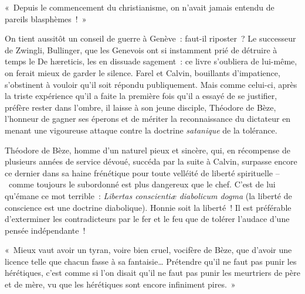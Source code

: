 \documentclass[french,twoside]{book} %
\newcommand{\astermono}{\medskip\centerline{\color{rubric}\large\selectfont{\syms ✻}}\medskip\par}%
\newcommand\foreign[1]{\emph{#1}}
\newenvironment{quoteblock}%
  {\begin{quoting}}
  {\end{quoting}}
\newenvironment{quotebar}{%
    \def\FrameCommand{{\color{rubric!10!}\vrule width 0.5em} \hspace{0.9em}}%
    \def\OuterFrameSep{2pt} %
    \MakeFramed {\advance\hsize-\width \FrameRestore}
  }%
  {%
    \endMakeFramed
  }
\renewenvironment{quoteblock}%
  {%
    \savenotes
    \setstretch{0.9}
    \normalfont
    \begin{quotebar}
  }
  {%
    \end{quotebar}
    \spewnotes
  }
\begin{document}
\begin{quoteblock}
\noindent « Depuis le commencement du christianisme, on n’avait jamais entendu de pareils blasphèmes ! »\end{quoteblock}

\noindent On tient aussitôt un conseil de guerre à Genève : faut-il riposter ? Le successeur de Zwingli, Bullinger, que les Genevois ont si instamment prié de détruire à temps le De hæreticis, les en dissuade sagement : ce livre s’oubliera de lui-même, on ferait mieux de garder le silence. Farel et Calvin, bouillants d’impatience, s’obstinent à vouloir qu’il soit répondu publiquement. Mais comme celui-ci, après la triste expérience qu’il a faite la première fois qu’il a essayé de se justifier, préfère rester dans l’ombre, il laisse à son jeune disciple, Théodore de Bèze, l’honneur de gagner ses éperons et de mériter la reconnaissance du dictateur en menant une vigoureuse attaque contre la doctrine \emph{satanique} de la tolérance.\par

\astermono

\noindent Théodore de Bèze, homme d’un naturel pieux et sincère, qui, en récompense de plusieurs années de service dévoué, succéda par la suite à Calvin, surpasse encore ce dernier dans sa haine frénétique pour toute velléité de liberté spirituelle – comme toujours le subordonné est plus dangereux que le chef. C’est de lui qu’émane ce mot terrible : \foreign{Libertas conscientiæ diabolicum dogma} (la liberté de conscience est une doctrine diabolique). Honnie soit la liberté ! Il est préférable d’exterminer les contradicteurs par le fer et le feu que de tolérer l’audace d’une pensée indépendante !\par

\begin{quoteblock}
\noindent « Mieux vaut avoir un tyran, voire bien cruel, vocifère de Bèze, que d’avoir une licence telle que chacun fasse à sa fantaisie… Prétendre qu’il ne faut pas punir les hérétiques, c’est comme si l’on disait qu’il ne faut pas punir les meurtriers de père et de mère, vu que les hérétiques sont encore infiniment pires. »\end{quoteblock}
\end{document}

